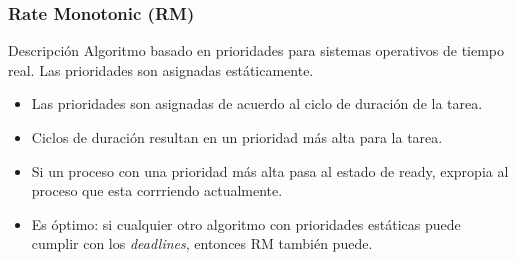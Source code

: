 \begin{frame}
    \frametitle{Rate Monotonic (\textbf{RM})}

    \begin{exampleblock}{Descripción}
        Algoritmo basado en prioridades para sistemas operativos de tiempo real. Las prioridades son asignadas estáticamente.
    \end{exampleblock}

    \begin{itemize}
        \item Las prioridades son asignadas de acuerdo al ciclo de duración de la tarea.
        \item Ciclos de duración resultan en un prioridad más alta para la tarea.
        \item Si un proceso con una prioridad más alta pasa al estado de ready, expropia al proceso que esta corrriendo actualmente.
        \item Es óptimo: si cualquier otro algoritmo con prioridades estáticas puede cumplir con los \textit{deadlines}, entonces RM también puede.
    \end{itemize}

\end{frame}